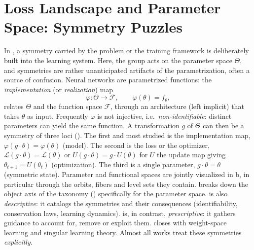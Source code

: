 \documentclass[mathematics,review,submit,moreauthors]{Definitions/mdpi}
\begin{document}
\section{Loss Landscape and Parameter Space: Symmetry Puzzles}\label{sec:parameter-space-symmetries}
In , a symmetry carried by the problem or the training framework is deliberately built into the learning system.
Here, the group acts on the parameter space $\Theta$, and symmetries are rather unanticipated artifacts of the parametrization, often a source of confusion.
Neural networks are parametrized functions: the \emph{implementation} (or \emph{realization}) map
\begin{equation}\label{eq:implementation-map}
    \varphi:\Theta\to\mathcal{F}, \qquad \varphi(\theta)=f_\theta,
\end{equation}
relates $\Theta$ and the function space $\mathcal F$, through an architecture (left implicit) that takes $\theta$ as input.
Frequently $\varphi$ is not injective, i.e.\ \emph{non-identifiable}: distinct parameters can yield the same function.
A transformation $g$ of $\Theta$ can then be a symmetry of three loci ().
The first and most studied is the implementation map, $\varphi(g\cdot\theta)=\varphi(\theta)$ (model).
The second is the loss or the optimizer, $\mathcal L(g\cdot\theta)=\mathcal L(\theta)$ or $U(g\cdot\theta)=g\cdot U(\theta)$ for $U$ the update map giving $\theta_{t+1}=U(\theta_t)$ (optimization).
The third is a single parameter, $g\cdot\theta=\theta$ (symmetric state).
Parameter and functional spaces are jointly visualized in  b, in particular through the orbits, fibers and level sets they contain.
 breaks down the object axis of the taxonomy () specifically for the parameter space.
 is also \emph{descriptive}: it catalogs the symmetries and their consequences (identifiability, conservation laws, learning dynamics).
 is, in contrast, \emph{prescriptive}: it gathers guidance to account for, remove or exploit them.
 closes with weight-space learning and singular learning theory.
Almost all works treat these symmetries \emph{explicitly}.
\end{document}

